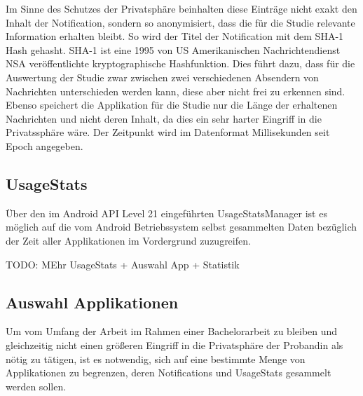 Im Sinne des Schutzes der Privatsphäre beinhalten diese Einträge nicht exakt den Inhalt der Notification, sondern so anonymisiert, dass die für die Studie relevante Information erhalten bleibt.
So wird der Titel der Notification mit dem SHA-1 Hash\cite{sha1def} gehasht.
SHA-1 ist eine 1995 von US Amerikanischen Nachrichtendienst NSA veröffentlichte kryptographische Hashfunktion\cite{sha1proposal}.
Dies führt dazu, dass für die Auswertung der Studie zwar zwischen zwei verschiedenen Absendern von Nachrichten unterschieden werden kann, diese aber nicht frei zu erkennen sind.
Ebenso speichert die Applikation für die Studie nur die Länge der erhaltenen Nachrichten und nicht deren Inhalt, da dies ein sehr harter Eingriff in die Privatssphäre wäre.
Der Zeitpunkt wird im Datenformat Millisekunden seit Epoch angegeben.


\subsection{UsageStats}

Über den im Android API Level 21 eingeführten UsageStatsManager ist es möglich 
auf die vom Android Betriebssystem selbst gesammelten Daten bezüglich der Zeit aller Applikationen im Vordergrund zuzugreifen.


TODO: MEhr UsageStats + Auswahl App + Statistik

\subsection{Auswahl Applikationen}

Um vom Umfang der Arbeit im Rahmen einer Bachelorarbeit zu bleiben und gleichzeitig nicht einen größeren Eingriff in die Privatsphäre der Probandin als nötig zu tätigen,
ist es notwendig, sich auf eine bestimmte Menge von Applikationen zu begrenzen, deren Notifications und UsageStats gesammelt werden sollen.

